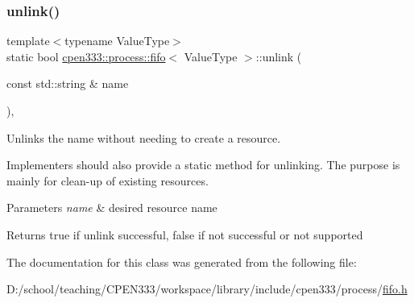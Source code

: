 \subsubsection{\texorpdfstring{unlink()}{unlink()}\hspace{0.1cm}{\footnotesize\ttfamily [2/2]}}
{\footnotesize\ttfamily template$<$typename Value\+Type$>$ \\
static bool \hyperlink{classcpen333_1_1process_1_1fifo}{cpen333\+::process\+::fifo}$<$ Value\+Type $>$\+::unlink (\begin{DoxyParamCaption}\item[{const std\+::string \&}]{name }\end{DoxyParamCaption})\hspace{0.3cm}{\ttfamily [inline]}, {\ttfamily [static]}}



Unlinks the name without needing to create a resource. 

Implementers should also provide a static method for unlinking. The purpose is mainly for clean-\/up of existing resources.


\begin{DoxyParams}{Parameters}
{\em name} & desired resource name \\
\hline
\end{DoxyParams}
\begin{DoxyReturn}{Returns}
{\ttfamily true} if unlink successful, {\ttfamily false} if not successful or not supported 
\end{DoxyReturn}


The documentation for this class was generated from the following file\+:\begin{DoxyCompactItemize}
\item 
D\+:/school/teaching/\+C\+P\+E\+N333/workspace/library/include/cpen333/process/\hyperlink{process_2fifo_8h}{fifo.\+h}\end{DoxyCompactItemize}
